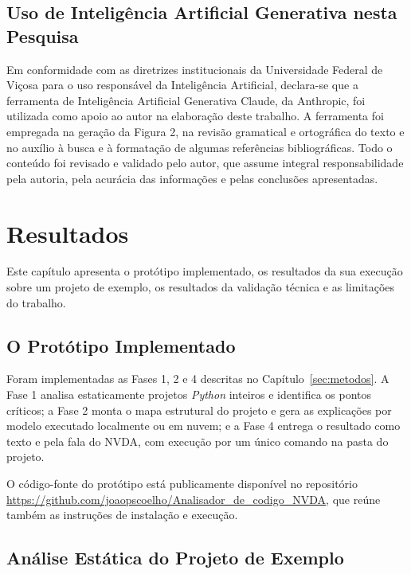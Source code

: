 \documentclass[
    12pt,                   %
    openright,              %
    oneside,                %
    a4paper,                %
    sumario=tradicional,    %
    english,                %
    brazil,                 %
    ]{abntex2}
\begin{document}
\section{Uso de Inteligência Artificial Generativa nesta Pesquisa}\label{sec:usoia}

Em conformidade com as diretrizes institucionais da Universidade Federal de Viçosa para o uso responsável da Inteligência Artificial, declara-se que a ferramenta de Inteligência Artificial Generativa Claude, da Anthropic, foi utilizada como apoio ao autor na elaboração deste trabalho. A ferramenta foi empregada na geração da Figura 2, na revisão gramatical e ortográfica do texto e no auxílio à busca e à formatação de algumas referências bibliográficas. Todo o conteúdo foi revisado e validado pelo autor, que assume integral responsabilidade pela autoria, pela acurácia das informações e pelas conclusões apresentadas.

\chapter{Resultados}\label{sec:resultados}

Este capítulo apresenta o protótipo implementado, os resultados da sua execução sobre um projeto de exemplo, os resultados da validação técnica e as limitações do trabalho.

\section{O Protótipo Implementado}\label{sec:implementado}

Foram implementadas as Fases 1, 2 e 4 descritas no Capítulo~\ref{sec:metodos}. A Fase 1 analisa estaticamente projetos \textit{Python} inteiros e identifica os pontos críticos; a Fase 2 monta o mapa estrutural do projeto e gera as explicações por modelo executado localmente ou em nuvem; e a Fase 4 entrega o resultado como texto e pela fala do NVDA, com execução por um único comando na pasta do projeto.

O código-fonte do protótipo está publicamente disponível no repositório \url{https://github.com/joaopscoelho/Analisador_de_codigo_NVDA}, que reúne também as instruções de instalação e execução.

\section{Análise Estática do Projeto de Exemplo}\label{sec:resultanalise}
\end{document}
